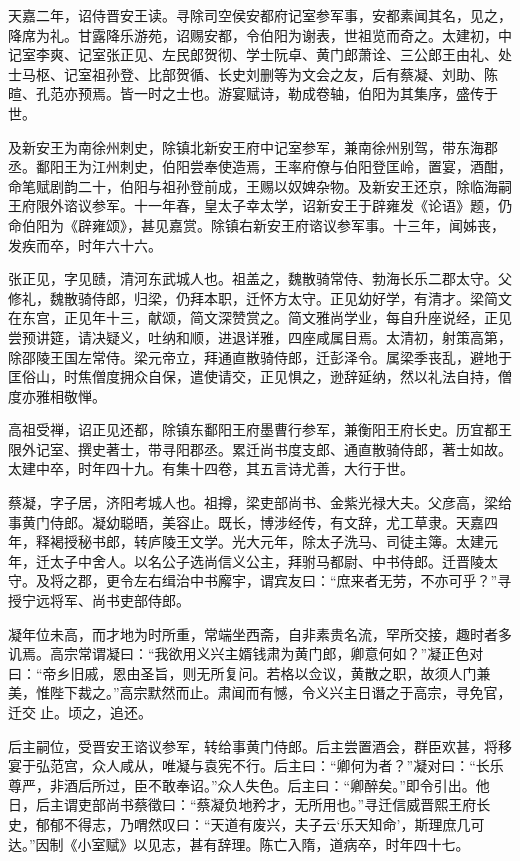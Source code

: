\documentclass[]{article}
\begin{document}
天嘉二年，诏侍晋安王读。寻除司空侯安都府记室参军事，安都素闻其名，见之，降席为礼。甘露降乐游苑，诏赐安都，令伯阳为谢表，世祖览而奇之。太建初，中记室李爽、记室张正见、左民郎贺彻、学士阮卓、黄门郎萧诠、三公郎王由礼、处士马枢、记室祖孙登、比部贺循、长史刘删等为文会之友，后有蔡凝、刘助、陈暄、孔范亦预焉。皆一时之士也。游宴赋诗，勒成卷轴，伯阳为其集序，盛传于世。

及新安王为南徐州刺史，除镇北新安王府中记室参军，兼南徐州别驾，带东海郡丞。鄱阳王为江州刺史，伯阳尝奉使造焉，王率府僚与伯阳登匡岭，置宴，酒酣，命笔赋剧韵二十，伯阳与祖孙登前成，王赐以奴婢杂物。及新安王还京，除临海嗣王府限外谘议参军。十一年春，皇太子幸太学，诏新安王于辟雍发《论语》题，仍命伯阳为《辟雍颂》，甚见嘉赏。除镇右新安王府谘议参军事。十三年，闻姊丧，发疾而卒，时年六十六。

张正见，字见赜，清河东武城人也。祖盖之，魏散骑常侍、勃海长乐二郡太守。父修礼，魏散骑侍郎，归梁，仍拜本职，迁怀方太守。正见幼好学，有清才。梁简文在东宫，正见年十三，献颂，简文深赞赏之。简文雅尚学业，每自升座说经，正见尝预讲筵，请决疑义，吐纳和顺，进退详雅，四座咸属目焉。太清初，射策高第，除邵陵王国左常侍。梁元帝立，拜通直散骑侍郎，迁彭泽令。属梁季丧乱，避地于匡俗山，时焦僧度拥众自保，遣使请交，正见惧之，逊辞延纳，然以礼法自持，僧度亦雅相敬惮。

高祖受禅，诏正见还都，除镇东鄱阳王府墨曹行参军，兼衡阳王府长史。历宜都王限外记室、撰史著士，带寻阳郡丞。累迁尚书度支郎、通直散骑侍郎，著士如故。太建中卒，时年四十九。有集十四卷，其五言诗尤善，大行于世。

蔡凝，字子居，济阳考城人也。祖撙，梁吏部尚书、金紫光禄大夫。父彦高，梁给事黄门侍郎。凝幼聪晤，美容止。既长，博涉经传，有文辞，尤工草隶。天嘉四年，释褐授秘书郎，转庐陵王文学。光大元年，除太子洗马、司徒主簿。太建元年，迁太子中舍人。以名公子选尚信义公主，拜驸马都尉、中书侍郎。迁晋陵太守。及将之郡，更令左右缉治中书廨宇，谓宾友曰：``庶来者无劳，不亦可乎？''寻授宁远将军、尚书吏部侍郎。

凝年位未高，而才地为时所重，常端坐西斋，自非素贵名流，罕所交接，趣时者多讥焉。高宗常谓凝曰：``我欲用义兴主婿钱肃为黄门郎，卿意何如？''凝正色对曰：``帝乡旧戚，恩由圣旨，则无所复问。若格以佥议，黄散之职，故须人门兼美，惟陛下裁之。''高宗默然而止。肃闻而有憾，令义兴主日谮之于高宗，寻免官，迁交止。顷之，追还。

后主嗣位，受晋安王谘议参军，转给事黄门侍郎。后主尝置酒会，群臣欢甚，将移宴于弘范宫，众人咸从，唯凝与袁宪不行。后主曰：``卿何为者？''凝对曰：``长乐尊严，非酒后所过，臣不敢奉诏。''众人失色。后主曰：``卿醉矣。''即令引出。他日，后主谓吏部尚书蔡徵曰：``蔡凝负地矜才，无所用也。''寻迁信威晋熙王府长史，郁郁不得志，乃喟然叹曰：``天道有废兴，夫子云`乐天知命'，斯理庶几可达。''因制《小室赋》以见志，甚有辞理。陈亡入隋，道病卒，时年四十七。
\end{document}
